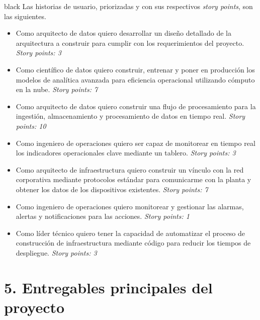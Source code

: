\documentclass[11pt]{charter}
\begin{document}
\begin{consigna}{black}
Las historias de usuario, priorizadas y con sus respectivos \textit{story points}, son las siguientes.

\begin{itemize}
\item Como arquitecto de datos quiero desarrollar un diseño detallado de la arquitectura a construir para cumplir con los requerimientos del proyecto. \textit{Story points: 3}
\item Como científico de datos quiero construir, entrenar y poner en producción los modelos de analítica avanzada para eficiencia operacional utilizando cómputo en la nube. \textit{Story points: 7}
\item Como arquitecto de datos quiero construir una flujo de procesamiento para la ingestión, almacenamiento y procesamiento de datos en tiempo real. \textit{Story points: 10}
\item Como ingeniero de operaciones quiero ser capaz de monitorear en tiempo real los indicadores operacionales clave mediante un tablero. \textit{Story points: 3}
\item Como arquitecto de infraestructura quiero construir un vínculo con la red corporativa mediante protocolos estándar para comunicarme con la planta y obtener los datos de los dispositivos existentes. \textit{Story points: 7}
\item Como ingeniero de operaciones quiero monitorear y gestionar las alarmas, alertas y notificaciones para las acciones. \textit{Story points: 1}

\item Como líder técnico quiero tener la capacidad de automatizar el proceso de construcción de infraestructura mediante código para reducir los tiempos de despliegue. \textit{Story points: 3}
\end{itemize}

\end{consigna}

\section{5. Entregables principales del proyecto}
\label{sec:entregables}
\end{document}
